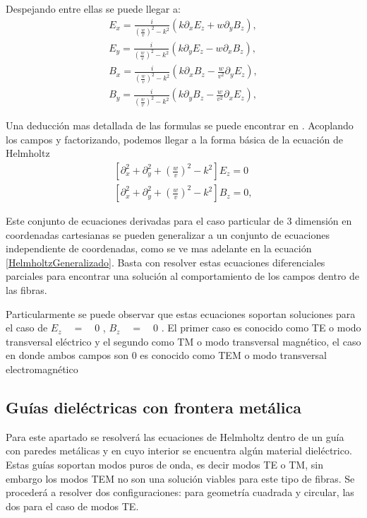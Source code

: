 Despejando entre ellas se puede llegar a:
\begin{subequations}\label{Ecuacionesdecampo}
	\begin{align}
	E_{x} = \frac{i}{(\frac{w}{v})^2 - k^2} (k \partial_{x} E_{z}+w \partial_{y} B_{z}), \\
	E_{y} = \frac{i}{(\frac{w}{v})^2 - k^2} (k \partial_{y} E_{z}-w \partial_{x} B_{z}), \\
	B_{x} = \frac{i}{(\frac{w}{v})^2 - k^2} (k \partial_{x}B_{z}- \frac{w}{v^2} \partial_{y} E_{z}), \\
	B_{y} = \frac{i}{(\frac{w}{v})^2 - k^2} (k \partial_{y}B_{z}- \frac{w}{v^2} \partial_{x} E_{z}), 
	\end{align}
\end{subequations}
\par Una deducción mas detallada de las formulas se puede encontrar en \cite{GriffithsElec}. Acoplando los campos y factorizando, podemos llegar a la forma básica de la ecuación de Helmholtz 
\begin{subequations}\label{Helmholtz}
	\begin{align}
	[\partial_{x}^2+\partial_{y}^2+(\frac{w}{v})^2-k^2] E_{z}=0\\
	[\partial_{x}^2+\partial_{y}^2+(\frac{w}{v})^2-k^2] B_{z}=0,
	\end{align}
\end{subequations}
\par Este conjunto de ecuaciones derivadas para el caso particular de 3 dimensión en coordenadas cartesianas se pueden generalizar a un conjunto de ecuaciones independiente de coordenadas, como se ve mas adelante en la ecuación \ref{HelmholtzGeneralizado}. Basta con resolver estas ecuaciones diferenciales parciales para encontrar una solución al comportamiento de los campos dentro de las fibras. 
\par Particularmente se puede observar que estas ecuaciones soportan soluciones para el caso de $E_{z}\quad=\quad0$ , $B_{z}\quad =\quad 0$ . El primer caso es conocido como TE o modo transversal eléctrico y el segundo como  TM o modo transversal magnético, el caso en donde ambos campos son  0 es conocido como TEM o modo transversal electromagnético
\subsection{Guías dieléctricas con frontera metálica}
\par Para este apartado se resolverá las ecuaciones de Helmholtz dentro de un guía con paredes metálicas y en cuyo interior se encuentra algún material dieléctrico. Estas guías soportan modos puros de onda, es decir modos TE o TM, sin embargo los modos TEM no son una solución viables para este tipo de fibras. Se procederá a resolver dos configuraciones: para geometría cuadrada y circular, las dos para el caso de modos TE. 
